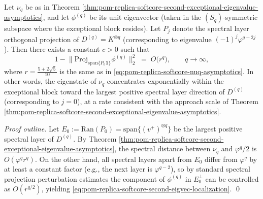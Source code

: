 \begin{theorem}[Spectral layer localization of the second exceptional eigenvector: exponential concentration toward the \texorpdfstring{$j=0$}{j=0} layer]\label{thm:pom-replica-softcore-second-exceptional-eigenvector-localization}
Let \(\nu_q\) be as in Theorem \ref{thm:pom-replica-softcore-second-exceptional-eigenvalue-asymptotics}, and let \(\phi^{(q)}\) be its unit eigenvector (taken in the \((S_q)\)-symmetric subspace where the exceptional block resides).
Let \(P_j\) denote the spectral layer orthogonal projection of \(D^{(q)}=K^{\otimes q}\) (corresponding to eigenvalue \((-1)^j\varphi^{q-2j}\)).
Then there exists a constant \(c>0\) such that
\begin{equation}\label{eq:pom-replica-softcore-second-eigvec-localization}
1-\bigl\|\mathrm{Proj}_{\mathrm{span}\{P_0\mathbf{1}\}}\phi^{(q)}\bigr\|_2^2
\;=\;
O\!\bigl(r^{q}\bigr),
\qquad q\to\infty,
\end{equation}
where \(r=\frac{5+2\sqrt5}{10}\) is the same as in \eqref{eq:pom-replica-softcore-nuq-asymptotics}.
In other words, the eigenstate of \(\nu_q\) concentrates exponentially within the exceptional block toward the largest positive spectral layer direction of \(D^{(q)}\) (corresponding to \(j=0\)), at a rate consistent with the approach scale of Theorem \ref{thm:pom-replica-softcore-second-exceptional-eigenvalue-asymptotics}.
\end{theorem}
\begin{proof}[Proof outline]
Let \(E_0:=\mathrm{Ran}(P_0)=\mathrm{span}\{(v^+)^{\otimes q}\}\) be the largest positive spectral layer of \(D^{(q)}\).
By Theorem \ref{thm:pom-replica-softcore-second-exceptional-eigenvalue-asymptotics}, the spectral distance between \(\nu_q\) and \(\varphi^q/2\) is \(O(\varphi^q r^{q})\).
On the other hand, all spectral layers apart from \(E_0\) differ from \(\varphi^q\) by at least a constant factor (e.g., the next layer is \(\varphi^{q-2}\)),
so by standard spectral projection perturbation estimates the component of \(\phi^{(q)}\) in \(E_0^\perp\) can be controlled as \(O(r^{q/2})\),
yielding \eqref{eq:pom-replica-softcore-second-eigvec-localization}. \qed
\end{proof}

\endinput
